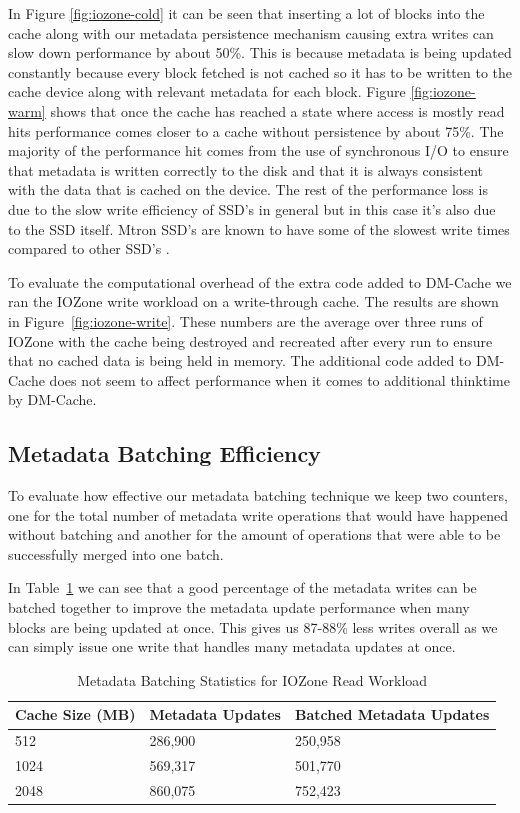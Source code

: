 In Figure \ref{fig:iozone-cold} it can be seen that inserting a lot of
blocks into the cache along with our metadata persistence mechanism
causing extra writes can slow down performance by about 50\%. This is
because metadata is being updated constantly because every block
fetched is not cached so it has to be written to the cache device
along with relevant metadata for each block. Figure
\ref{fig:iozone-warm} shows that once the cache has reached a state
where access is mostly read hits performance comes closer to a cache
without persistence by about 75\%. The majority of the performance hit
comes from the use of synchronous I/O to ensure that metadata is
written correctly to the disk and that it is always consistent with
the data that is cached on the device. The rest of the performance
loss is due to the slow write efficiency of SSD's in general but in
this case it's also due to the SSD itself. Mtron SSD's are known to
have some of the slowest write times compared to other SSD's
\cite{FIOS}.

To evaluate the computational overhead of the extra code added to
DM-Cache we ran the IOZone write workload on a write-through
cache. The results are shown in Figure~\ref{fig:iozone-write}. These
numbers are the average over three runs of IOZone with the cache being
destroyed and recreated after every run to ensure that no cached data
is being held in memory. The additional code added to DM-Cache does
not seem to affect performance when it comes to additional thinktime
by DM-Cache.

\subsection{Metadata Batching Efficiency}

To evaluate how effective our metadata batching technique we keep two
counters, one for the total number of metadata write operations that
would have happened without batching and another for the amount of
operations that were able to be successfully merged into one batch.

In Table~\ref{table:batching} we can see that a good percentage of the
metadata writes can be batched together to improve the metadata update
performance when many blocks are being updated at once. This gives us
87-88\% less writes overall as we can simply issue one write that
handles many metadata updates at once.

\begin{table}[t]
  \caption{Metadata Batching Statistics for IOZone Read Workload}
  \centering
  \resizebox{0.5\textwidth}{!} {
    \begin{tabular}{ | l | l | l | }
      \hline
      Cache Size (MB) & Metadata Updates & Batched Metadata Updates \\ \hline
      512 & 286,900 & 250,958 \\ \hline
      1024 & 569,317 & 501,770 \\ \hline
      2048 & 860,075 & 752,423 \\
      \hline
    \end{tabular}
  }
  \label{table:batching}
\end{table}
